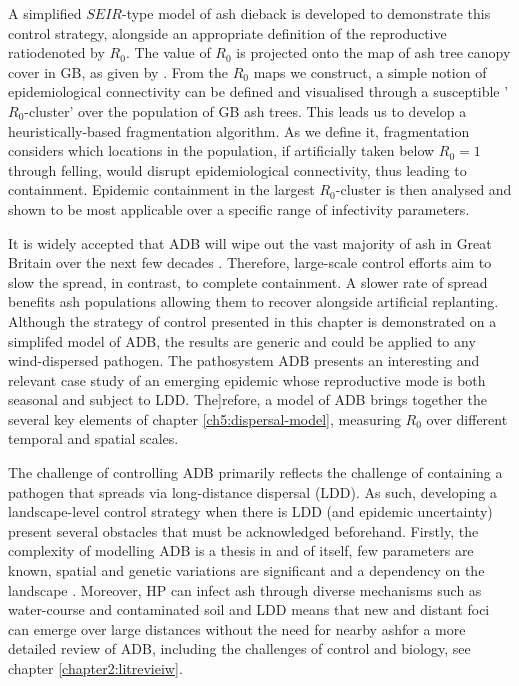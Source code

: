 A simplified $SEIR$-type model of ash dieback is developed to demonstrate this control strategy, alongside an appropriate definition of the reproductive ratio\textemdash denoted by $R_0$. The value of $R_0$ is projected onto the map of ash tree canopy cover in GB, as given by \cite{hill.data}. From the $R_0$ maps we construct, a simple notion of epidemiological connectivity can be defined and visualised through a susceptible '$R_0$-cluster' over the population of GB ash trees. This leads us to develop a heuristically-based fragmentation algorithm. As we define it, fragmentation considers which locations in the population, if artificially taken below $R_0 = 1$ through felling, would disrupt epidemiological connectivity\textemdash, thus leading to containment. Epidemic containment in the largest $R_0$-cluster is then analysed and shown to be most applicable over a specific range of infectivity parameters.

It is widely accepted that ADB will wipe out the vast majority of ash in Great Britain over the next few decades \cite{ash-dieback-costs}. Therefore, large-scale control efforts aim to slow the spread, in contrast, to complete containment. %
A slower rate of spread benefits ash populations allowing them to recover alongside artificial replanting.%
Although the strategy of control presented in this chapter is demonstrated on a simplifed model of ADB, the results are generic and could be applied to any wind-dispersed pathogen.
The pathosystem ADB presents an interesting and relevant case study of an emerging epidemic whose reproductive mode is both seasonal and subject to LDD. The]refore, a model of ADB brings together the several key elements of chapter \ref{ch5:dispersal-model}, measuring $R_0$ over different temporal and spatial scales. 

The challenge of controlling ADB primarily reflects the challenge of containing a pathogen that spreads via long-distance dispersal (LDD). As such, developing a landscape-level control strategy when there is LDD (and epidemic uncertainty) present several obstacles that must be acknowledged beforehand. Firstly, the complexity of modelling ADB is a thesis in and of itself, few parameters are known, spatial and genetic variations are significant \cite{stocks2017first, mckinney2014ash} and a dependency on the landscape \cite{doi:10.1111/1365-2745.13383}. Moreover, HP can infect ash through diverse mechanisms such as water-course and contaminated soil and LDD means that new and distant foci can emerge over large distances without the need for nearby ash\textemdash for a more detailed review of ADB, including the challenges of control and biology, see chapter \ref{chapter2:litrevieiw}.

